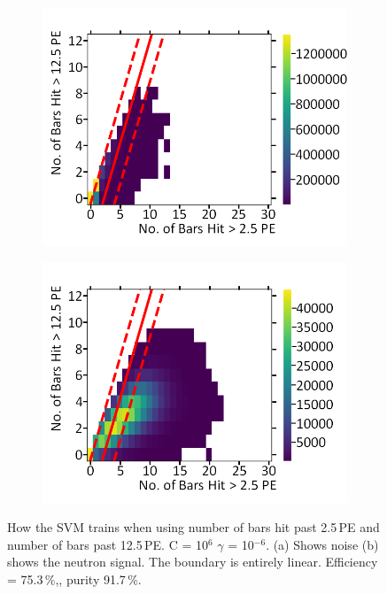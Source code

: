 \begin{figure}[!h]
\centering
\begin{subfigure}{.5\textwidth}
  \centering
  \includegraphics[width=\linewidth]{Appendix1/Figs/Bars1Bars2Noise.png}
  \captionsetup{width=.9\linewidth}
  \caption{}
  \label{subFig:Bars1Bars2N}
\end{subfigure}%
\begin{subfigure}{.5\textwidth}
  \centering
\includegraphics[width=\linewidth]{Appendix1/Figs/Bars1Bars2Signal.png}
  \captionsetup{width=.9\linewidth}
  \caption{}
  \label{subFig:Bars1Bar2S}
\end{subfigure}
\caption{How the SVM trains when using number of bars hit past 2.5\,PE and number of bars past 12.5\,PE. C = 10$^6$ $\gamma$ = 10$^{-6}$. (a) Shows noise (b) shows the neutron signal. The boundary is entirely linear. Efficiency = 75.3\,\%,, purity 91.7\,\%.}
\label{fig:Bars1BarsSN}
\end{figure}

